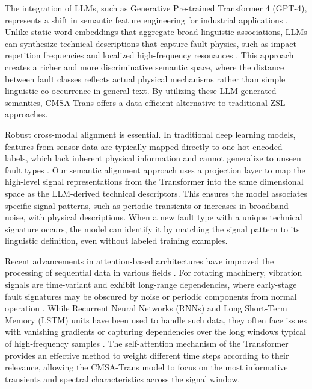\documentclass[journal]{IEEEtran}
\begin{document}
The integration of LLMs, such as Generative Pre-trained Transformer 4 (GPT-4), represents a shift in semantic feature engineering for industrial applications \cite{bubeck2023sparks}. Unlike static word embeddings that aggregate broad linguistic associations, LLMs can synthesize technical descriptions that capture fault physics, such as impact repetition frequencies and localized high-frequency resonances \cite{brown2020language}. This approach creates a richer and more discriminative semantic space, where the distance between fault classes reflects actual physical mechanisms rather than simple linguistic co-occurrence in general text. By utilizing these LLM-generated semantics, CMSA-Trans offers a data-efficient alternative to traditional ZSL approaches.

Robust cross-modal alignment is essential. In traditional deep learning models, features from sensor data are typically mapped directly to one-hot encoded labels, which lack inherent physical information and cannot generalize to unseen fault types \cite{goodfellow2016deep, lecun2015deep}. Our semantic alignment approach uses a projection layer to map the high-level signal representations from the Transformer into the same dimensional space as the LLM-derived technical descriptors. This ensures the model associates specific signal patterns, such as periodic transients or increases in broadband noise, with physical descriptions. When a new fault type with a unique technical signature occurs, the model can identify it by matching the signal pattern to its linguistic definition, even without labeled training examples.

Recent advancements in attention-based architectures have improved the processing of sequential data in various fields \cite{devlin2018bert, dosovitskiy2020image}. For rotating machinery, vibration signals are time-variant and exhibit long-range dependencies, where early-stage fault signatures may be obscured by noise or periodic components from normal operation \cite{zhang2021attention}. While Recurrent Neural Networks (RNNs) and Long Short-Term Memory (LSTM) units have been used to handle such data, they often face issues with vanishing gradients or capturing dependencies over the long windows typical of high-frequency samples \cite{hochreiter1997long}. The self-attention mechanism of the Transformer provides an effective method to weight different time steps according to their relevance, allowing the CMSA-Trans model to focus on the most informative transients and spectral characteristics across the signal window.
\end{document}
